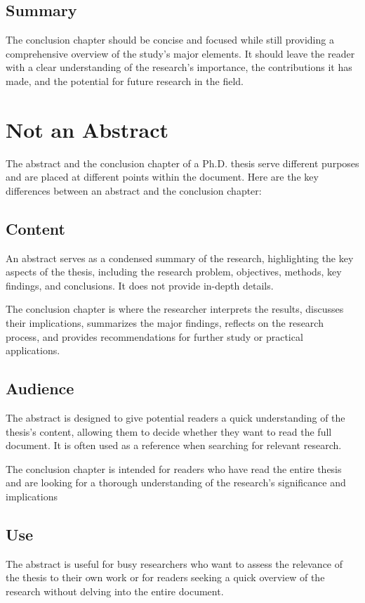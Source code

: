 \subsection{Summary}
The conclusion chapter should be concise and focused while still providing a comprehensive overview of the study's major elements. It should leave the reader with a clear understanding of the research's importance, the contributions it has made, and the potential for future research in the field.

\section{Not an Abstract}
The abstract and the conclusion chapter of a Ph.D. thesis serve different purposes and are placed at different points within the document. Here are the key differences between an abstract and the conclusion chapter:

\subsection*{Content}
 
An abstract serves as a condensed summary of the research, highlighting the key aspects of the thesis, including the research problem, objectives, methods, key findings, and conclusions. It does not provide in-depth details.

The conclusion chapter is where the researcher interprets the results, discusses their implications, summarizes the major findings, reflects on the research process, and provides recommendations for further study or practical applications.

\subsection*{Audience}
The abstract is designed to give potential readers a quick understanding of the thesis's content, allowing them to decide whether they want to read the full document. It is often used as a reference when searching for relevant research.

The conclusion chapter is intended for readers who have read the entire thesis and are looking for a thorough understanding of the research's significance and implications

\subsection*{Use}
The abstract is useful for busy researchers who want to assess the relevance of the thesis to their own work or for readers seeking a quick overview of the research without delving into the entire document.

